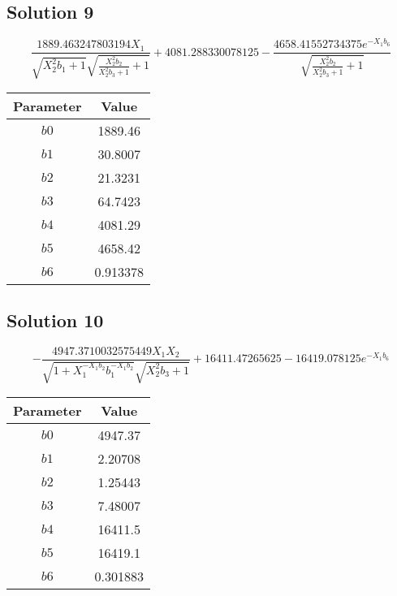 \documentclass{article}
\begin{document}
\subsection*{Solution 9}
\[
\frac{1889.463247803194 X_{1}}{\sqrt{X_{2}^{2} b_{1} + 1} \sqrt{\frac{X_{2}^{2} b_{2}}{X_{2}^{2} b_{3} + 1} + 1}} + 4081.288330078125 - \frac{4658.41552734375 e^{- X_{1} b_{6}}}{\sqrt{\frac{X_{2}^{2} b_{2}}{X_{2}^{2} b_{3} + 1} + 1}}
\]
\begin{center}
\begin{tabular}{cc}
\toprule
Parameter & Value \\
\midrule
$b0$ & 1889.46 \\
$b1$ & 30.8007 \\
$b2$ & 21.3231 \\
$b3$ & 64.7423 \\
$b4$ & 4081.29 \\
$b5$ & 4658.42 \\
$b6$ & 0.913378 \\
\bottomrule
\end{tabular}
\end{center}

\vspace{1em}
\subsection*{Solution 10}
\[
- \frac{4947.3710032575449 X_{1} X_{2}}{\sqrt{1 + X_{1}^{- X_{1} b_{2}} b_{1}^{- X_{1} b_{2}}} \sqrt{X_{2}^{2} b_{3} + 1}} + 16411.47265625 - 16419.078125 e^{- X_{1} b_{6}}
\]
\begin{center}
\begin{tabular}{cc}
\toprule
Parameter & Value \\
\midrule
$b0$ & 4947.37 \\
$b1$ & 2.20708 \\
$b2$ & 1.25443 \\
$b3$ & 7.48007 \\
$b4$ & 16411.5 \\
$b5$ & 16419.1 \\
$b6$ & 0.301883 \\
\bottomrule
\end{tabular}
\end{center}

\vspace{1em}
\end{document}
